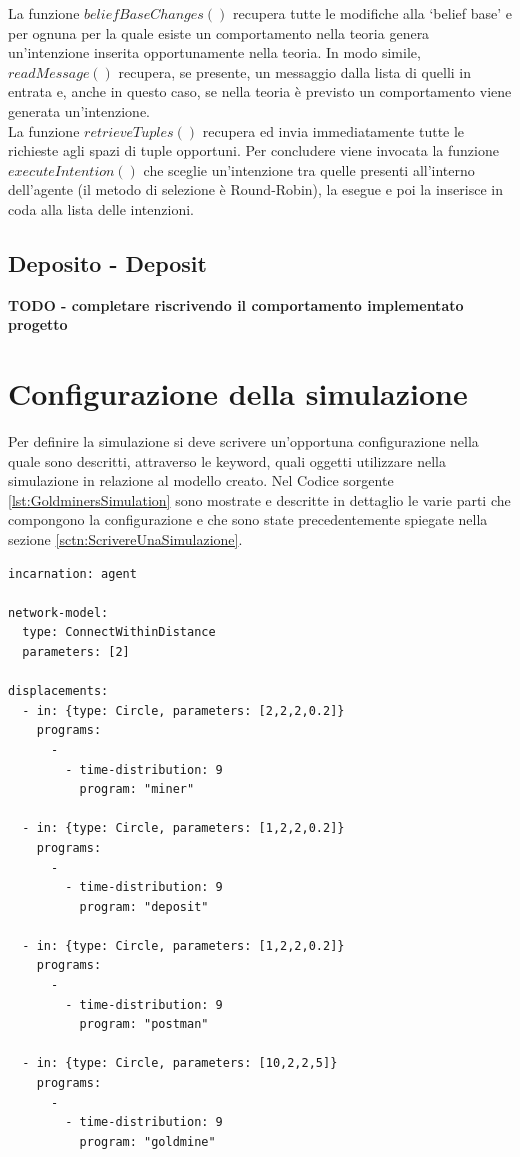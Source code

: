 La funzione $beliefBaseChanges()$ recupera tutte le modifiche alla `belief base' e per ognuna per la quale esiste un comportamento nella teoria genera un'intenzione inserita opportunamente nella teoria. In modo simile, $readMessage()$ recupera, se presente, un messaggio dalla lista di quelli in entrata e, anche in questo caso, se nella teoria è previsto un comportamento viene generata un'intenzione.
\\
La funzione $retrieveTuples()$ recupera ed invia immediatamente tutte le richieste agli spazi di tuple opportuni.
Per concludere viene invocata la funzione $executeIntention()$ che sceglie un'intenzione tra quelle presenti all'interno dell'agente (il metodo di selezione è Round-Robin), la esegue e poi la inserisce in coda alla lista delle intenzioni.

\subsection{Deposito - Deposit}
\textbf{TODO - completare riscrivendo il comportamento implementato progetto}




\section{Configurazione della simulazione}
Per definire la simulazione si deve scrivere un'opportuna configurazione nella quale sono descritti, attraverso le keyword, quali oggetti utilizzare nella simulazione in relazione al modello creato. Nel Codice sorgente \ref{lst:GoldminersSimulation} sono mostrate e descritte in dettaglio le varie parti che compongono la configurazione e che sono state precedentemente spiegate nella sezione \ref{sctn:ScrivereUnaSimulazione}.

\medskip
\begin{lstlisting}[firstnumber=1,label={lst:GoldminersSimulation},caption={Configurazione simulazione Goldminers}]
incarnation: agent

network-model:
  type: ConnectWithinDistance
  parameters: [2]

displacements:
  - in: {type: Circle, parameters: [2,2,2,0.2]}
    programs:
      -
        - time-distribution: 9
          program: "miner"

  - in: {type: Circle, parameters: [1,2,2,0.2]}
    programs:
      -
        - time-distribution: 9
          program: "deposit"

  - in: {type: Circle, parameters: [1,2,2,0.2]}
    programs:
      -
        - time-distribution: 9
          program: "postman"

  - in: {type: Circle, parameters: [10,2,2,5]}
    programs:
      -
        - time-distribution: 9
          program: "goldmine"
\end{lstlisting}

